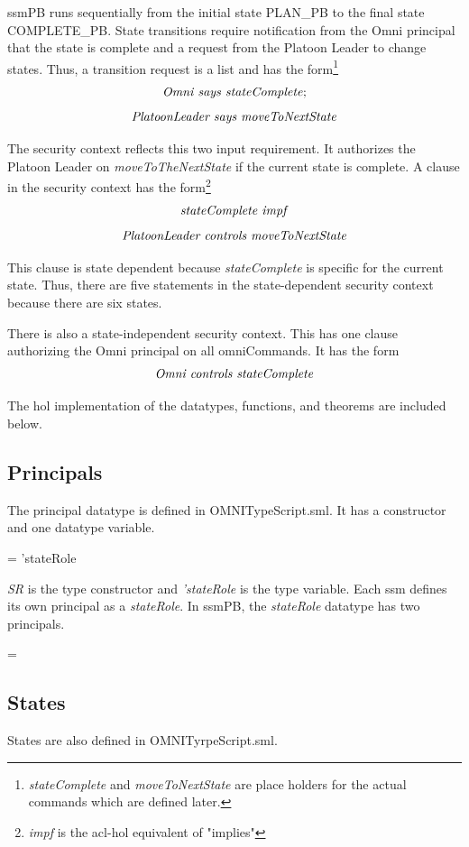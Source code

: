 \documentclass[../../main/main.tex]{subfiles}
\begin{document}
ssmPB runs sequentially from the initial state PLAN_PB to the final state COMPLETE_PB.  State transitions require notification from the Omni principal that the state is complete and a request from the Platoon Leader to change states.  Thus, a transition request is a list and has the form\footnote{\textit{stateComplete} and \textit{moveToNextState} are place holders for the actual commands which are defined later.} 
\[\text{\textit{Omni says stateComplete}};\]
\[\text{\textit{PlatoonLeader says moveToNextState}}\]  

The security context reflects this two input requirement.  It authorizes the Platoon Leader on \textit{moveToTheNextState} if the current state is complete. A clause in the security context has the form\footnote{\textit{impf} is the \gls{acl}-\gls{hol} equivalent of "implies"}
\[\text{\textit{stateComplete impf}}\]
\[\text{\textit{PlatoonLeader controls moveToNextState}}\]  

This clause is state dependent because \textit{stateComplete} is specific for the current state.  Thus, there are five statements in the state-dependent security context because there are six states.

There is also a state-independent security context.  This has one clause authorizing the Omni principal on all omniCommands.   It has the form
\[\text{\textit{Omni controls stateComplete}}\]

The \gls{hol} implementation of the datatypes, functions, and theorems are included below.


\subsection{Principals}
The principal datatype is defined in OMNITypeScript.sml.  It has a constructor and one datatype variable.

 =  'stateRole

\textit{SR} is the type constructor and \textit{'stateRole} is the type variable.  Each \gls{ssm} defines its own principal as a \textit{stateRole}. In ssmPB, the \textit{stateRole} datatype has two principals.

 =  \HOLTokenBar{} 

\subsection{States}
States are also defined in OMNITyrpeScript.sml.
\end{document}
